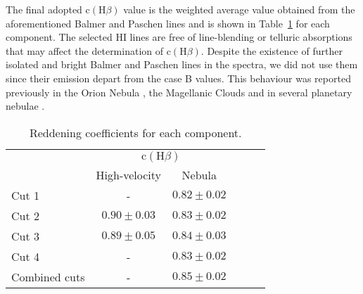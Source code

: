 \documentclass[fleqn,usenatbib]{mnras}
\begin{document}
\noindent  The final adopted $\text{c}(\text{H}\beta)$ value is the weighted average value obtained from the aforementioned Balmer and Paschen lines and is shown in Table~\ref{tab:c_extin} for each component. The selected H\thinspace I lines are free of line-blending or telluric absorptions that may affect the determination of $\text{c}(\text{H}\beta)$. Despite the existence of further isolated and bright Balmer and Paschen lines in the spectra, we did not use them since their emission depart from the case B values. This behaviour was reported previously  in the Orion Nebula \citep{mesadelgado09}, the Magellanic Clouds \citep{dominguezguzman19} and in several planetary nebulae \citep[PNe, see][]{rodriguez20}. 


\begin{table}
\caption{Reddening coefficients for each component.}
\label{tab:c_extin}
\begin{tabular}{lccccc}
\hline
 & \multicolumn{2}{c}{$\text{c}(\text{H}\beta)$} \\
 & High-velocity & Nebula\\
\hline
Cut 1 & - & $0.82 \pm  0.02$\\
Cut 2 & $0.90 \pm 0.03$ &$0.83 \pm 0.02$\\
Cut 3 &$0.89 \pm 0.05 $&$0.84 \pm 0.03$\\
Cut 4 & - & $0.83 \pm  0.02$\\
Combined cuts &-&$0.85 \pm 0.02$\\
\hline
\end{tabular}
\end{table}
\end{document}

